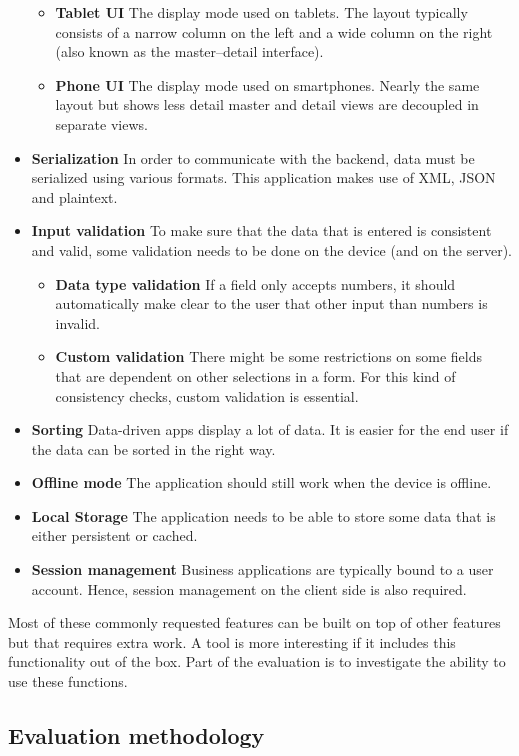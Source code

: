 \begin{itemize}
\begin{itemize}
        \item \textbf{Tablet UI} The display mode used on tablets. The layout typically consists of a narrow column on the left and a wide column on the right (also known as the master--detail interface).
        \item \textbf{Phone UI} The display mode used on smartphones. Nearly the same layout but shows less detail master and detail views are decoupled in separate views.
    \end{itemize}
    \item \textbf{Serialization} In order to communicate with the backend,  data must be serialized using various formats. This application makes use of XML, JSON and plaintext.
    \item \textbf{Input validation} To make sure that the data that is entered is consistent and valid, some validation needs to be done on the device (and on the server).
    \begin{itemize}
        \item \textbf{Data type validation} If a field only accepts numbers, it should automatically make clear to the user that other input than numbers is invalid.
        \item \textbf{Custom validation} There might be some restrictions on some fields that are dependent on other selections in a form. For this kind of consistency checks, custom validation is essential.
    \end{itemize}
    \item \textbf{Sorting} Data-driven apps display a lot of data. It is easier for the end user if the data can be sorted in the right way. 
    \item \textbf{Offline mode} The application should still work when the device is offline.
    \item \textbf{Local Storage} The application needs to be able to store some data that is either persistent or cached.
    \item \textbf{Session management} Business applications are typically bound to a user account. Hence, session management on the client side is also required.
\end{itemize}

Most of these commonly requested features can be built on top of other features but that requires extra work. A tool is more interesting if it includes this functionality out of the box. Part of the evaluation is to investigate the ability to use these functions.

\subsection{Evaluation methodology}
\label{sec:evaluation-method}

